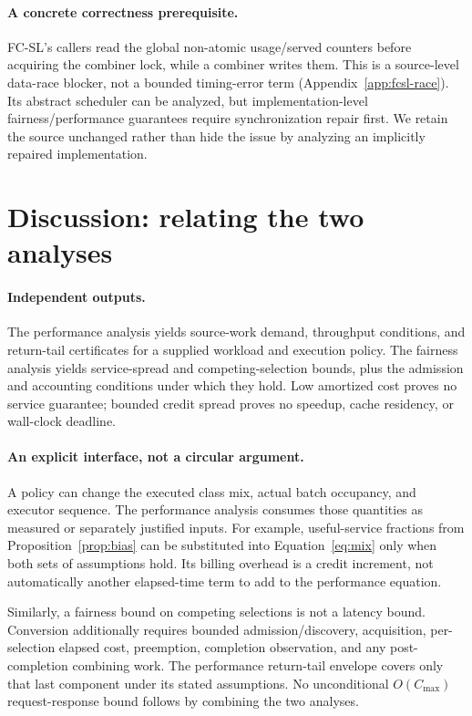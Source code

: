 \paragraph{A concrete correctness prerequisite.}
FC-SL's callers read the global non-atomic usage/served counters before
acquiring the combiner lock, while a combiner writes them. This is a
source-level data-race blocker, not a bounded timing-error term
(Appendix~\ref{app:fcsl-race}). Its abstract scheduler can be analyzed, but
implementation-level fairness/performance guarantees require synchronization
repair first. We retain the source unchanged rather than hide the issue by
analyzing an implicitly repaired implementation.


\clearpage

\clearpage
\balance

\section{Discussion: relating the two analyses}
\label{sec:discussion}
\paragraph{Independent outputs.}
The performance analysis yields source-work demand, throughput conditions,
and return-tail certificates for a supplied workload and execution policy.
The fairness analysis yields service-spread and competing-selection bounds,
plus the admission and accounting conditions under which they hold.
Low amortized cost proves no service guarantee; bounded credit spread proves
no speedup, cache residency, or wall-clock deadline.

\paragraph{An explicit interface, not a circular argument.}
A policy can change the executed class mix, actual batch occupancy, and
executor sequence. The performance analysis consumes those quantities as
measured or separately justified inputs. For example, useful-service
fractions from Proposition~\ref{prop:bias} can be substituted into
Equation~\eqref{eq:mix} only when both sets of assumptions hold.
Its billing overhead is a credit increment, not automatically another
elapsed-time term to add to the performance equation.

Similarly, a fairness bound on competing selections is not a latency bound.
Conversion additionally requires bounded admission/discovery, acquisition,
per-selection elapsed cost, preemption, completion observation, and any
post-completion combining work. The performance return-tail envelope covers
only that last component under its stated assumptions. No unconditional
$O(C_{\max})$ request-response bound follows by combining the two analyses.

